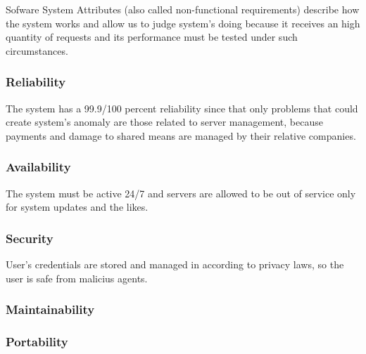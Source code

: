 Sofware System Attributes (also called non-functional requirements) describe how the system works and allow us to judge system's doing because it receives an high quantity of requests and its performance must be tested under such circumstances.

\subsubsection{Reliability}
The system has a 99.9/100 percent reliability since that only problems that could create system's anomaly are those related to server management, because payments and damage to shared means are managed by their relative companies.

\subsubsection{Availability}
The system must be active 24/7 and servers are allowed to be out of service only for system updates and the likes.

\subsubsection{Security}
User's credentials are stored and managed in according to privacy laws, so the user is safe from malicius agents.

\subsubsection{Maintainability}

\subsubsection{Portability}
